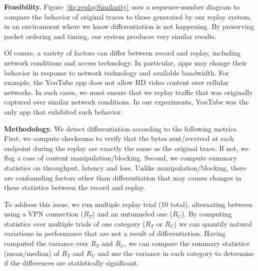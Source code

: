 



\noindent\textbf{Feasibility.}
Figure~\ref{fig:replaySimilarity} uses a sequence-number diagram to compare the behavior of original traces 
to those generated by our replay system, in an environment where we know differentiation is not happening. 
By preserving packet ordering and timing, our system produces very similar results. 


Of course, a variety of factors can differ between record and replay, including network 
conditions and access technology. In particular, apps may change their behavior in response 
to network technology and available bandwidth. For example, the YouTube app does not 
allow HD video content over cellular networks. In such cases, we must ensure that we replay 
traffic that was originally captured over similar network conditions. 
In our experiments, YouTube was the only app that exhibited such behavior.





\noindent\textbf{Methodology.} We detect differentiation according to the following metrics. First, we 
compute checksums to verify that the bytes sent/received at each endpoint during the replay are 
exactly the same as the original trace. If not, we flag a case of content manipulation/blocking. Second, we
compute summary statistics on throughput, latency and loss. Unlike manipulation/blocking, there are 
confounding factors other than differentiation that may causes changes in these statistics between the 
record and replay.

To address this issue, we run multiple replay trial (10 total), alternating between using a VPN connection ($R_T$) and 
an untunneled one ($R_U$). By computing statistics over multiple trials of one category ($R_T$ or $R_U$) we can quantify 
natural variations in performance that are not a result of differentiation. Having computed the variance over $R_T$ and $R_U$, we can 
compare the summary statistics (mean/median) of $R_T$ and $R_U$ and use the variance in each category 
to determine if the differences are statistically significant.

